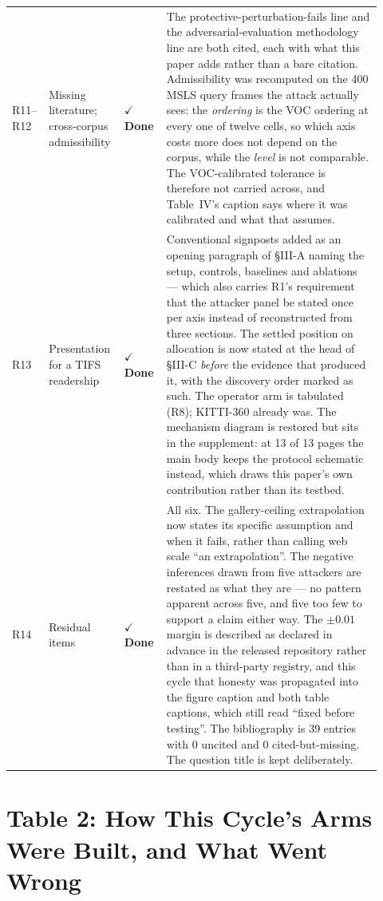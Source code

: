 \documentclass[11pt]{article}
\newcommand{\done}{\textcolor{DoneGreen}{\textbf{$\checkmark$ Done}}}
\begin{document}
\begin{longtable}{@{}p{0.05\linewidth}p{0.19\linewidth}p{0.11\linewidth}p{0.57\linewidth}@{}}
R11--R12 & Missing literature; cross-corpus admissibility & \done & The
protective-perturbation-fails line and the adversarial-evaluation methodology
line are both cited, each with what this paper adds rather than a bare
citation. Admissibility was recomputed on the 400 MSLS query frames the attack
actually sees: the \emph{ordering} is the VOC ordering at every one of twelve
cells, so which axis costs more does not depend on the corpus, while the
\emph{level} is not comparable. The VOC-calibrated tolerance is therefore not
carried across, and Table~IV's caption says where it was calibrated and what
that assumes. \\
\addlinespace

R13 & Presentation for a TIFS readership & \done & Conventional signposts added
as an opening paragraph of \S III-A naming the setup, controls, baselines and
ablations --- which also carries R1's requirement that the attacker panel be
stated once per axis instead of reconstructed from three sections. The settled
position on allocation is now stated at the head of \S III-C \emph{before} the
evidence that produced it, with the discovery order marked as such. The
operator arm is tabulated (R8); KITTI-360 already was. The mechanism diagram is
restored but sits in the supplement: at 13 of 13 pages the main body keeps the
protocol schematic instead, which draws this paper's own contribution rather
than its testbed. \\
\addlinespace

R14 & Residual items & \done & All six. The gallery-ceiling extrapolation now
states its specific assumption and when it fails, rather than calling web
scale ``an extrapolation''. The negative inferences drawn from five attackers
are restated as what they are --- no pattern apparent across five, and five too
few to support a claim either way. The $\pm0.01$ margin is described as
declared in advance in the released repository rather than in a third-party
registry, and this cycle that honesty was propagated into the figure caption
and both table captions, which still read ``fixed before testing''. The
bibliography is 39 entries with 0 uncited and 0 cited-but-missing. The question
title is kept deliberately. \\

\bottomrule
\end{longtable}

\section*{Table 2: How This Cycle's Arms Were Built, and What Went Wrong}
\end{document}
